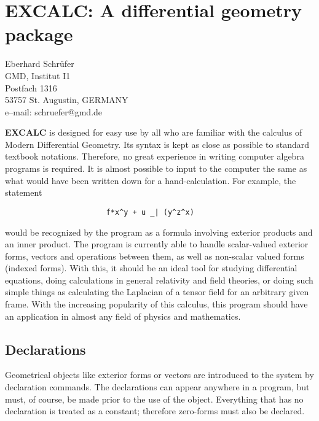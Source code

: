 \chapter[EXCALC: Differential Geometry]%
{EXCALC: A differential geometry package}
\label{EXCALC}

{\footnotesize
\begin{center}
Eberhard Schr\"{u}fer \\
GMD, Institut I1   \\
Postfach 1316      \\
53757 St. Augustin, GERMANY \\[0.05in]
e--mail: schruefer@gmd.de
\end{center}
}


{\bf EXCALC} is designed for easy use by all who are familiar with the
calculus of Modern Differential Geometry.  Its syntax is kept as close
as possible to standard textbook notations.  Therefore, no great
experience in writing computer algebra programs is required.  It is
almost possible to input to the computer the same as what would have
been written down for a hand-calculation.  For example, the statement

\begin{verbatim}
                       f*x^y + u _| (y^z^x)
\end{verbatim}

would be recognized by the program as a formula involving exterior
products and an inner product.  The program is currently able to
handle scalar-valued exterior forms, vectors and operations between
them, as well as non-scalar valued forms (indexed forms).  With this,
it should be an ideal tool for studying differential equations,
doing calculations in general relativity and field theories, or doing
such simple things as calculating the Laplacian of a tensor field for
an arbitrary given frame.  With the increasing popularity of this
calculus, this program should have an application in almost any field
of physics and mathematics.

\section{Declarations}

Geometrical objects like exterior forms or vectors are introduced to the
system by declaration commands.  The declarations can appear anywhere in
a program, but must, of course, be made prior to the use of the object.
Everything that has no declaration is treated as a constant; therefore
zero-forms must also be declared.

